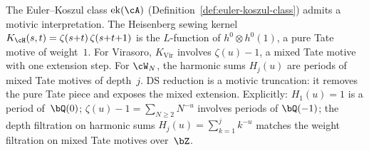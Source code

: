 \begin{remark}%
\label{rem:motivic-weight-ek}%
The Euler--Koszul class $\operatorname{ek}(\cA)$
(Definition~\ref{def:euler-koszul-class}) admits a motivic
interpretation. The Heisenberg sewing kernel
$K_\cH(s,t) = \zeta(s{+}t)\,\zeta(s{+}t{+}1)$
is the $L$-function of $h^0 \otimes h^0(1)$, a pure Tate
motive of weight~$1$. For Virasoro,
$K_{\mathrm{Vir}}$ involves $\zeta(u) - 1$, a mixed Tate
motive with one extension step. For $\cW_N$, the harmonic
sums $H_j(u)$ are periods of mixed Tate motives of depth~$j$.
DS reduction is a motivic truncation: it removes
the pure Tate piece and exposes the mixed extension.
Explicitly: $H_1(u) = 1$ is a period of~$\bQ(0)$;
$\zeta(u) - 1 = \sum_{N \geq 2}N^{-u}$ involves periods of
$\bQ(-1)$; the depth filtration on harmonic sums
$H_j(u) = \sum_{k=1}^j k^{-u}$ matches the weight
filtration on mixed Tate motives over~$\bZ$.
\end{remark}


